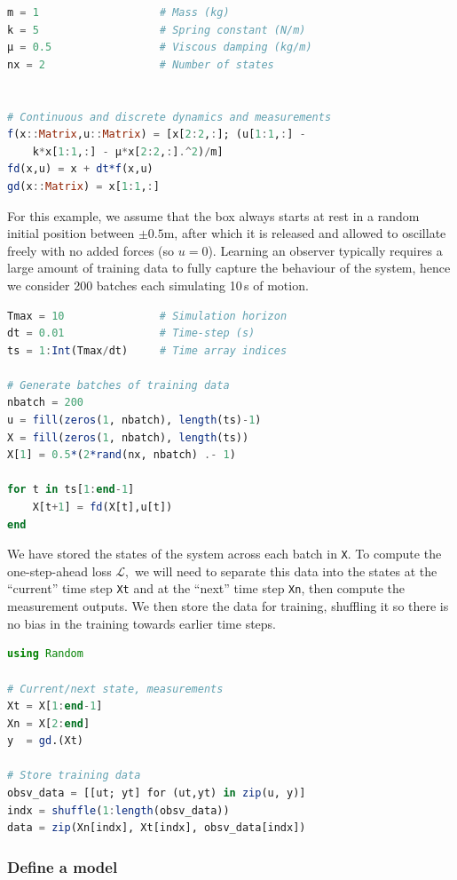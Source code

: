 \begin{lstlisting}[language = Julia]
m = 1                   # Mass (kg)
k = 5                   # Spring constant (N/m)
μ = 0.5                 # Viscous damping (kg/m)
nx = 2                  # Number of states


# Continuous and discrete dynamics and measurements
f(x::Matrix,u::Matrix) = [x[2:2,:]; (u[1:1,:] - 
    k*x[1:1,:] - μ*x[2:2,:].^2)/m]
fd(x,u) = x + dt*f(x,u)
gd(x::Matrix) = x[1:1,:]
\end{lstlisting}

For this example, we assume that the box always starts at rest in a random initial position between $\pm0.5$m, after which it is released and allowed to oscillate freely with no added forces (so $u = 0$). Learning an observer typically requires a large amount of training data to fully capture the behaviour of the system, hence we consider 200 batches each simulating 10\,s of motion.
\begin{lstlisting}[language = Julia]
Tmax = 10               # Simulation horizon
dt = 0.01               # Time-step (s)
ts = 1:Int(Tmax/dt)     # Time array indices

# Generate batches of training data
nbatch = 200
u = fill(zeros(1, nbatch), length(ts)-1)
X = fill(zeros(1, nbatch), length(ts))
X[1] = 0.5*(2*rand(nx, nbatch) .- 1)

for t in ts[1:end-1]
    X[t+1] = fd(X[t],u[t])
end
\end{lstlisting}
We have stored the states of the system across each batch in \verb|X|. To compute the one-step-ahead loss $\mathcal{L},$ we will need to separate this data into the states at the ``current'' time step \verb|Xt| and at the ``next'' time step \verb|Xn|, then compute the measurement outputs. We then store the data for training, shuffling it so there is no bias in the training towards earlier time steps.
\begin{lstlisting}[language = Julia]
using Random

# Current/next state, measurements
Xt = X[1:end-1]
Xn = X[2:end]
y  = gd.(Xt)

# Store training data
obsv_data = [[ut; yt] for (ut,yt) in zip(u, y)]
indx = shuffle(1:length(obsv_data))
data = zip(Xn[indx], Xt[indx], obsv_data[indx])
\end{lstlisting}

\subsubsection{Define a model} \label{sec:observer-model}

